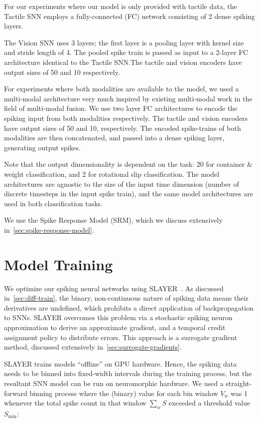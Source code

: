 \documentclass[fyp]{socreport}
\begin{document}
For our experiments where our model is only provided with tactile data, the
Tactile SNN employs a fully-connected (FC) network consisting of 2 dense spiking
layers.

The Vision SNN uses 3 layers; the first layer is a pooling layer with kernel
size and stride length of 4. The pooled spike train is passed as input to a
2-layer FC architecture identical to the Tactile SNN.\@ The tactile and vision
encoders have output sizes of 50 and 10 respectively.

For experiments where both modalities are available to the model, we used a
multi-modal architecture very much inspired by existing multi-modal work in
the field of multi-modal fusion. We use two layer FC architectures to encode the
spiking input from both modalities respectively. The tactile and vision encoders
have output sizes of 50 and 10, respectively. The encoded spike-trains of both
modalities are then concatenated, and passed into a dense spiking layer,
generating output spikes.

Note that the output dimensionality is dependent on the task: 20 for container \&
weight classification, and 2 for rotational slip classification. The model
architectures are agnostic to the size of the input time dimension (number of
discrete timesteps in the input spike train), and the same model architectures
are used in both classification tasks.

We use the Spike Response Model (SRM), which we discuss extensively
in~\autoref{sec:spike-response-model}.

\section{Model Training\label{sec:model-training}}

We optimize our spiking neural networks using SLAYER~\cite{NIPS2018_7415}. As
discussed in~\autoref{sec:diff-train}, the binary, non-continuous nature of
spiking data means their derivatives are undefined, which prohibits a direct
application of backpropagation to SNNs. SLAYER overcomes this problem via a
stochastic spiking neuron approximation to derive an approximate gradient, and a
temporal credit assignment policy to distribute errors. This approach is a
surrogate gradient method, discussed extensively
in~\autoref{sec:surrogate-gradients}.

SLAYER trains models ``offline'' on GPU hardware. Hence, the spiking data needs
to be binned into fixed-width intervals during the training process, but the
resultant SNN model can be run on neuromorphic hardware. We used a
straight-forward binning process where the (binary) value for each bin window
$V_{w}$ was 1 whenever the total spike count in that window $\sum_{w} S$
exceeded a threshold value $S_{\text{min}}$:
\end{document}
